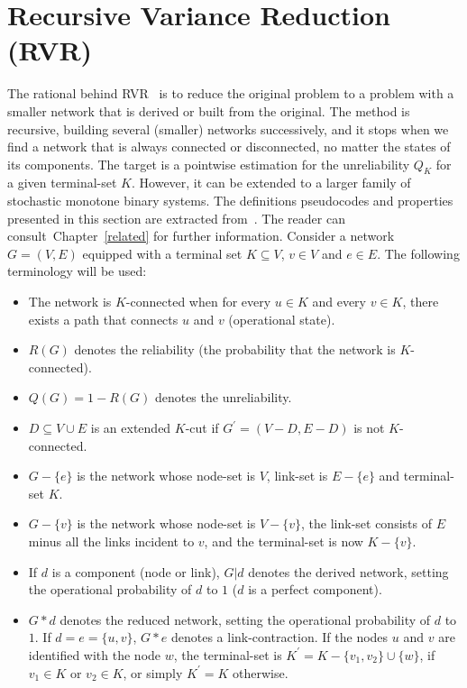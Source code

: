 \section{Recursive Variance Reduction (RVR)}\label{sec-rvr}
The rational behind RVR~\cite{4,85,2,78,10} is to reduce the 
original problem to a problem with a smaller network that is derived or built from the original. 
The method is recursive, building several (smaller) networks successively, and it stops when we find a 
network that is always connected or disconnected, no matter the states of its components. The target is 
a pointwise estimation for the unreliability $Q_K$ for a given terminal-set $K$. However, it can be extended 
to a larger family of stochastic monotone binary systems. The definitions pseudocodes and properties presented in this section are extracted from~\cite{4}. The reader can consult~Chapter~\ref{related} %
for further information. Consider a network $G=(V,E)$ equipped with a terminal set $K \subseteq V$, $v \in V$ and $e \in E$. 
The following terminology will be used:
\begin{itemize}
\item  The network is $K$-connected when for every $u \in K$ and every $v \in K$, there exists a path that connects $u$ and $v$ (operational state). 
\item $R(G)$ denotes the reliability (the probability that the network is $K$-connected).
\item $Q(G)=1-R(G)$ denotes the unreliability.
\item $D \subseteq V \cup E$ is an extended $K$-cut if $G^{\prime}=(V-D, E-D)$ is not $K$-connected.
\item $G-\{e\}$ is the network whose node-set is $V$, link-set is $E-\{e\}$ and terminal-set $K$.
\item $G-\{v\}$ is the network whose node-set is $V - \{v\}$, the link-set consists of $E$ minus all the links incident to $v$, and the terminal-set is now $K - \{v\}$.
\item If $d$ is a component (node or link), $G | d$ denotes the derived network, setting 
the operational probability of $d$ to $1$ ($d$ is a perfect component).
\item  $G*d$ denotes the reduced network, setting the operational probability of $d$ to $1$. 
If $d=e=\{u,v\}$, $G*e$ denotes a link-contraction. If the nodes $u$ and $v$ are identified with the node $w$, 
the terminal-set is $K^{\prime}=K-\{v_1,v_2\}\cup \{w\}$, if $v_1 \in K$ or $v_2 \in K$, 
or simply $K^{\prime}=K$ otherwise. 
\end{itemize}


